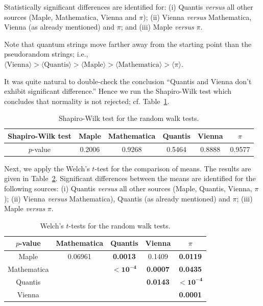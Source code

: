 \documentclass[%
 preprint,
 showpacs,
 showkeys,
 preprintnumbers,
 amsmath,amssymb,
 aps,
 prl,
  longbibliography,
 ]{revtex4-1}
\begin{document}
Statistically significant differences are identified for:
(i) Quantis {\it versus} all other sources (Maple, Mathematica, Vienna and $\pi$);
(ii) Vienna {\it versus} Mathematica, Vienna (as already
mentioned) and  $\pi$;  and
(iii) Maple {\it versus} $\pi$.


Note that quantum strings move farther away from the starting point than the pseudorandom strings; i.e.,
$\langle \text{Vienna} \rangle >\langle \text{Quantis} \rangle >\langle \text{Maple} \rangle >\langle \text{Mathematica} \rangle >\langle  \pi \rangle $.


It was quite natural to double-check the conclusion  ``Quantis and Vienna don't
exhibit significant difference.'' Hence we run the Shapiro-Wilk test which concludes
that normality is not rejected; cf. Table~\ref{tab:14}.


\begin{table}
\caption{Shapiro-Wilk test for the random walk tests.}\label{tab:14}
\begin{center}
\begin{tabular}
[c]{ c c c c c c }\hline\hline
Shapiro-Wilk test & Maple & Mathematica & Quantis & Vienna  & $\pi$\\\hline
$p$-value & 0.2006 & 0.9268 & 0.5464 & 0.8888 &
0.9577\\\hline\hline
\end{tabular}
\end{center}
\end{table}

Next, we apply the Welch's $t$-test for the comparison of means. The
results are given in Table~\ref{tab:15}.
Significant differences between the means are identified for the
following sources:
(i) Quantis {\it versus} all other sources (Maple, Quantis, Vienna, $\pi$);
(ii)
Vienna {\it versus} Mathematica), Quantis (as already mentioned) and $\pi$;
(iii) Maple {\it versus} $\pi$.

\begin{table}
\caption{Welch's $t$-tests for the random walk tests.}\label{tab:15}
\begin{center}
\begin{tabular}
[c]{ c c c c c }\hline\hline
$p$-value & Mathematica & Quantis & Vienna & $\pi$\\\hline
Maple & 0.06961 & \bf{0.0013} & 0.1409 & \bf{0.0119}\\
Mathematica &  & $\mathbf{< 10^{-4}}$ & \bf{0.0007} & \bf{0.0435}\\
Quantis &  &  & \bf{0.0143} & $\mathbf{< 10^{-4}}$\\
Vienna &  &  &  & \bf{0.0001}\\\hline\hline
\end{tabular}
\end{center}
\end{table}
\end{document}
